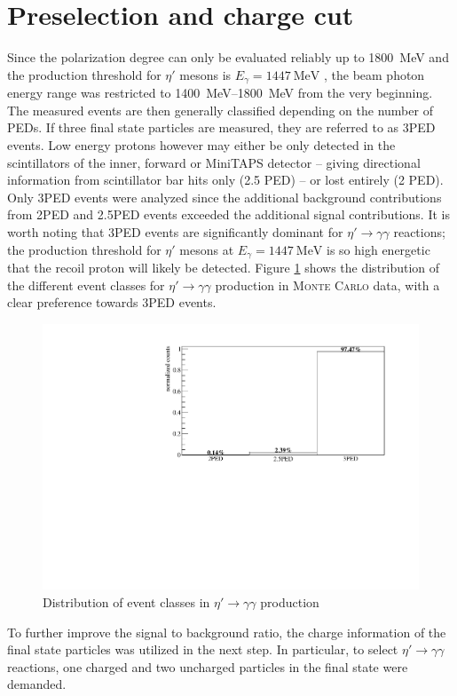 \section{Preselection and charge cut}
Since the polarization degree can only be evaluated reliably up to \SI{1800}{\mega\eV} and the production threshold for $\eta'$ mesons is $E_\gamma=\SI{1447}{\mega\eV}$ \cite{pdg}, the beam photon energy range was restricted to \SIrange{1400}{1800}{\mega\eV} from the very beginning. The measured events are then generally classified depending on the number of PEDs. If three final state particles are measured, they are referred to as 3PED events. Low energy protons however may either be only detected in the scintillators of the inner, forward or MiniTAPS detector -- giving directional information from scintillator bar hits only (2.5 PED) -- or lost entirely (2 PED). Only 3PED events were analyzed since the additional background contributions from 2PED and 2.5PED events exceeded the additional signal contributions. It is worth noting that 3PED events are significantly dominant for $\eta'\to\gamma\gamma$ reactions; the production threshold for $\eta'$ mesons at $E_\gamma=\SI{1447}{\mega\eV}$ \cite{pdg} is so high energetic that the recoil proton will likely be detected. Figure \ref{fig:PEDs} shows the distribution of the different event classes for $\eta'\to\gamma\gamma$ production in \textsc{Monte Carlo} data, with a clear preference towards 3PED events.
\begin{figure}[htbp]
	\centering
	\includegraphics[width=\linewidth]{../figs/hydrogen/PEDs.pdf}
	\caption{Distribution of event classes in $\eta'\to\gamma\gamma$ production}
	\label{fig:PEDs}
\end{figure}
To further improve the signal to background ratio, the charge information of the final state particles was utilized in the next step. In particular, to select  $\eta'\to\gamma\gamma$ reactions, one charged and two uncharged particles in the final state were demanded. 

